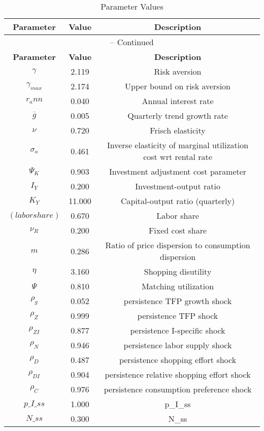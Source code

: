 \begin{center}
\begin{longtable}{ccc}
\caption{Parameter Values}\\%
\toprule%
\multicolumn{1}{c}{\textbf{Parameter}} &
\multicolumn{1}{c}{\textbf{Value}} &
 \multicolumn{1}{c}{\textbf{Description}}\\%
\midrule%
\endfirsthead
\multicolumn{3}{c}{{\tablename} \thetable{} -- Continued}\\%
\midrule%
\multicolumn{1}{c}{\textbf{Parameter}} &
\multicolumn{1}{c}{\textbf{Value}} &
  \multicolumn{1}{c}{\textbf{Description}}\\%
\midrule%
\endhead
${\gamma}$ 	 & 	 2.119 	 & 	 Risk aversion\\
${\gamma_{max}}$ 	 & 	 2.174 	 & 	 Upper bound on risk aversion\\
${r_ann}$ 	 & 	 0.040 	 & 	 Annual interest rate\\
${\overline{g}}$ 	 & 	 0.005 	 & 	 Quarterly trend growth rate\\
$\nu$ 	 & 	 0.720 	 & 	 Frisch elasticity\\
${\sigma_a}$ 	 & 	 0.461 	 & 	 Inverse elasticity of marginal utilization cost wrt rental rate\\
${\Psi_K}$ 	 & 	 0.903 	 & 	 Investment adjustment cost parameter\\
${I_Y}$ 	 & 	 0.200 	 & 	 Investment-output ratio\\
${K_Y}$ 	 & 	 11.000 	 & 	 Capital-output ratio (quarterly)\\
$(labor share)$ 	 & 	 0.670 	 & 	 Labor share\\
${\nu_R}$ 	 & 	 0.200 	 & 	 Fixed cost share\\
${m}$ 	 & 	 0.286 	 & 	 Ratio of price dispersion to consumption dispersion\\
${\eta}$ 	 & 	 3.160 	 & 	 Shopping disutility\\
${\Psi}$ 	 & 	 0.810 	 & 	 Matching utilization\\
${\rho_g}$ 	 & 	 0.052 	 & 	 persistence TFP growth shock\\
${\rho_Z}$ 	 & 	 0.999 	 & 	 persistence TFP shock\\
${\rho_{ZI}}$ 	 & 	 0.877 	 & 	 persistence I-specific shock\\
${\rho_N}$ 	 & 	 0.946 	 & 	 persistence labor supply shock\\
${\rho_D}$ 	 & 	 0.487 	 & 	 persistence shopping effort shock\\
${\rho_{DI}}$ 	 & 	 0.904 	 & 	 persistence relative shopping effort shock\\
${\rho_C}$ 	 & 	 0.976 	 & 	 persistence consumption preference shock\\
$p\_I\_ss$ 	 & 	 1.000 	 & 	 p\_I\_ss\\
$N\_ss$ 	 & 	 0.300 	 & 	 N\_ss\\
\bottomrule%
\end{longtable}
\end{center}
